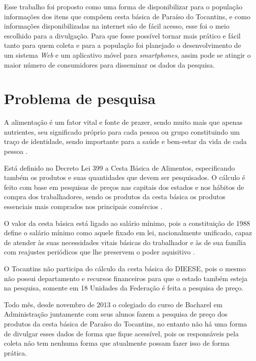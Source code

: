 \documentclass{ifto-tex}
\begin{document}
Esse trabalho foi proposto como uma forma de disponibilizar para o população informações dos itens que compõem cesta básica de Paraíso do Tocantins, e como informações disponibilizadas na internet são de fácil acesso, esse foi o meio escolhido para a divulgação. Para que fosse possível tornar mais prático e fácil tanto para quem coleta e para a população foi planejado o desenvolvimento de um sistema \textit{Web} e um aplicativo móvel para \textit{smartphones}, assim pode se atingir o maior número de consumidores para disseminar os dados da pesquisa.


	\section{Problema de pesquisa}
	
		A alimentação é um fator vital e fonte de prazer, sendo muito mais que apenas nutrientes, seu significado próprio para cada pessoa ou grupo constituindo um traço de identidade, sendo importante para a saúde e bem-estar da vida de cada pessoa \cite{loureiro2004importancia}.

Está definido no Decreto Lei 399 a Cesta Básica de Alimentos, especificando também os produtos e suas quantidades que devem ser pesquisados. O cálculo é feito com base em pesquisas de preços nas capitais dos estados e nos hábitos de compra dos trabalhadores, sendo os produtos da cesta básica os produtos essenciais mais comprados nos principais comércios \cite{metodolo8:online}.

O valor da cesta básica está ligado ao salário mínimo, pois a constituição de 1988 define o salário mínimo como aquele fixado em lei, nacionalmente unificado, capaz de atender às suas necessidades vitais básicas do trabalhador e às de sua família com reajustes periódicos que lhe preservem o poder aquisitivo \cite{metodolo8:online}.

O Tocantins não participa do cálculo da cesta básica do DIEESE, pois o mesmo não possui departamento e recursos financeiros para que o estado também esteja na pesquisa, somente em 18 Unidades da Federação é feita a pesquisa de preço.

Todo mês, desde novembro de 2013 o colegiado do curso de Bacharel em Administração juntamente com seus alunos fazem a pesquisa de preço dos produtos da cesta básica de Paraíso do Tocantins, no entanto não há uma forma de divulgar esses dados de forma que fique acessível, pois os responsáveis pela coleta não tem nenhuma forma que atualmente possam fazer isso de forma prática.
\end{document}

